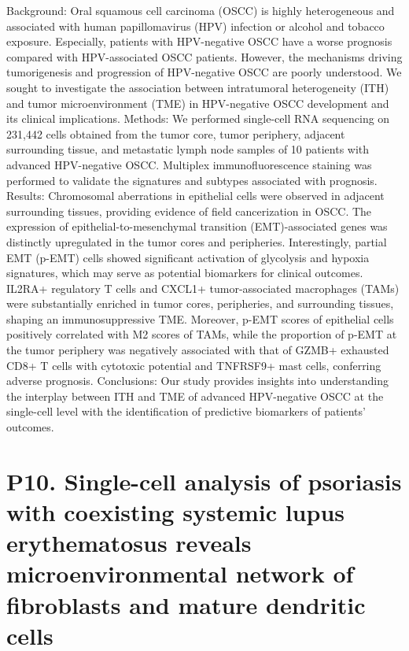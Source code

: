 \noindent
Background: Oral squamous cell carcinoma (OSCC) is highly heterogeneous and associated with human papillomavirus (HPV) infection or alcohol and tobacco exposure. Especially, patients with HPV-negative OSCC have a worse prognosis compared with HPV-associated OSCC patients. However, the mechanisms driving tumorigenesis and progression of HPV-negative OSCC are poorly understood. We sought to investigate the association between intratumoral heterogeneity (ITH) and tumor microenvironment (TME) in HPV-negative OSCC development and its clinical implications. Methods: We performed single-cell RNA sequencing on 231,442 cells obtained from the tumor core, tumor periphery, adjacent surrounding tissue, and metastatic lymph node samples of 10 patients with advanced HPV-negative OSCC. Multiplex immunofluorescence staining was performed to validate the signatures and subtypes associated with prognosis. Results: Chromosomal aberrations in epithelial cells were observed in adjacent surrounding tissues, providing evidence of field cancerization in OSCC. The expression of epithelial-to-mesenchymal transition (EMT)-associated genes was distinctly upregulated in the tumor cores and peripheries. Interestingly, partial EMT (p-EMT) cells showed significant activation of glycolysis and hypoxia signatures, which may serve as potential biomarkers for clinical outcomes. IL2RA+ regulatory T cells and CXCL1+ tumor-associated macrophages (TAMs) were substantially enriched in tumor cores, peripheries, and surrounding tissues, shaping an immunosuppressive TME. Moreover, p-EMT scores of epithelial cells positively correlated with M2 scores of TAMs, while the proportion of p-EMT at the tumor periphery was negatively associated with that of GZMB+ exhausted CD8+ T cells with cytotoxic potential and TNFRSF9+ mast cells, conferring adverse prognosis. Conclusions: Our study provides insights into understanding the interplay between ITH and TME of advanced HPV-negative OSCC at the single-cell level with the identification of predictive biomarkers of patients’ outcomes.
\newpage

\section*{P10. Single-cell analysis of psoriasis with coexisting systemic lupus erythematosus reveals microenvironmental network of fibroblasts and mature dendritic cells}

